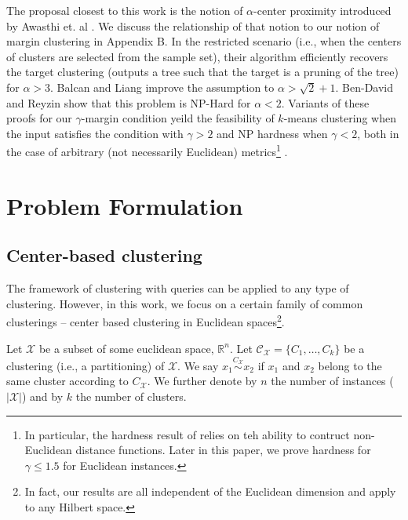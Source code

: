 \documentclass{article}
\newcommand{\mc}{\mathcal}
\begin{document}
The proposal closest to this work is the notion of $\alpha$-center proximity introduced by Awasthi et. al \cite{awasthi2012center}. We discuss the relationship of that notion to our notion of margin clustering in Appendix B. In the restricted scenario (i.e., when the centers of clusters are selected from the sample set), their algorithm efficiently recovers the target clustering (outputs a tree such that the target is a pruning of the tree) for $\alpha > 3$.  Balcan and Liang \cite{balcan2012clustering} improve the assumption to $\alpha > \sqrt{2} + 1$. Ben-David and Reyzin \cite{ben2014data} show that this problem is NP-Hard for $\alpha < 2$. 
Variants of these proofs for our $\gamma$-margin condition
yeild the feasibility of $k$-means clustering when the input satisfies the condition with $\gamma >2$ and NP hardness when $\gamma <2$, both in the case of arbitrary (not necessarily Euclidean) metrics\footnote{In particular, the hardness result of \cite{ben2014data} relies on teh ability to contruct non-Euclidean distance functions. Later in this paper, we prove hardness for $\gamma \leq 1.5$ for Euclidean instances.} .

\section{Problem Formulation}





\subsection{Center-based clustering}

The framework of clustering with queries can be applied to any type of clustering. However, in this work, we focus on a certain family of common clusterings -- center based clustering in Euclidean spaces\footnote{In fact, our results are all independent of the Euclidean dimension and apply to any Hilbert space.}.

Let ${\mc X}$ be a subset of some euclidean space, $\mathbb{R}^n$. Let $\mc C_{\mc X} = \{C_1, \ldots, C_k\}$ be a clustering (i.e., a partitioning) of $\mc X$. We say $x_1 \overset{C_{\mc X}}{\sim} x_2$ if $x_1$ and $x_2$ belong to the same cluster according to $C_{\mc X}$. We further denote by $n$ the number of instances ($|{\mc X}|$) and by $k$ the number of clusters.
\end{document}
